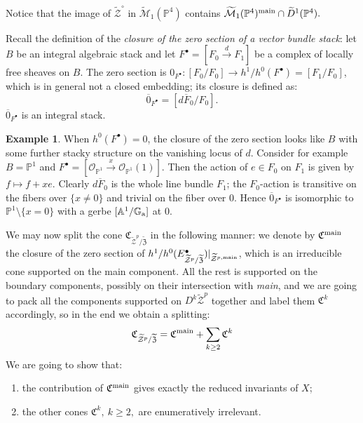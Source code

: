 \documentclass[11pt]{amsart}
\newcommand{\pazocal}{\mathcal}
\newcommand{\tM}{\widetilde{\mathcal{M}}}
\newcommand{\tZ}{\widetilde{\pazocal Z}}
\newcommand{\tZp}{\widetilde{\pazocal Z}^p}
\newcommand{\tXP}{\widetilde{\mathfrak Z}}
\newcommand{\PP}{\mathbb P}
\newcommand{\OO}{\mathcal{O}}
\renewcommand{\to}{\rightarrow}
\newcommand{\Aaff}{\mathbb{A}}
\theoremstyle{definition}
\theoremstyle{definition}
\newtheorem{ex}[thm]{Example}
\begin{document}
Notice that the image of $\tZ^{\circ}$ in $\tM_1(\PP^4)$ contains $\tM_1(\PP^4)^{\rm{main}}\cap \widetilde{D}^1(\PP^4).$

Recall the definition of the \emph{closure of the zero section of a vector bundle stack}: let $B$ be an integral algebraic stack and let $F^{\bullet}=[F_0\xrightarrow{d} F_1]$ be a complex of locally free sheaves on $B$. The zero section is $0_{F^{\bullet}}\colon [F_0/F_0]\to h^1/h^0(F^{\bullet})=[F_1/F_0]$, which is in general not a closed embedding; its closure is defined as:
\[ \overline{0}_{F^{\bullet}}=[\overline{dF_0}/F_0]. \]
$\overline{0}_{F^{\bullet}}$ is an integral stack.

\begin{ex}
When $h^0(F^{\bullet})=0$, the closure of the zero section looks like $B$ with some further stacky structure on the vanishing locus of $d$. Consider for example $B=\PP^1$ and $F^{\bullet}=[\OO_{\PP^1}\xrightarrow{x}\OO_{\PP^1}(1)]$. Then the action of $e\in F_0$ on $F_1$ is given by $f\mapsto f+xe$. Clearly $\overline{dF_0}$ is the whole line bundle $F_1$; the $F_0$-action is transitive on the fibers over $\{x\neq 0\}$ and trivial on the fiber over $0$. Hence $\overline{0}_{F^{\bullet}}$ is isomorphic to $\PP^1\setminus\{x=0\}$ with a gerbe $[\Aaff^1/\mathbb G_{\rm a}]$ at $0$.
\end{ex}

We may now split the cone $\mathfrak{C}_{\tZp/\tXP}$ in the following manner: we denote by $\mathfrak C^{\rm{main}}$ the closure of the zero section of $h^1/h^0(E^{\bullet}_{\tZp/\tXP})\rvert_{\tZ^{p,\rm{main}}}$, which is an irreducible cone supported on the main component. All the rest is supported on the boundary components, possibly on their intersection with \emph{main}, and we are going to pack all the components supported on $D^k\tZp$ together and label them $\mathfrak C^k$ accordingly, so in the end we obtain a splitting:
\[
 \mathfrak{C}_{\tZp/\tXP}=\mathfrak C^{\rm{main}}+\sum_{k\geq 2} \mathfrak C^k
\]
We are going to show that:
\begin{enumerate}
 \item the contribution of $\mathfrak C^{\rm{main}}$ gives exactly the reduced invariants of $X$;
 \item the other cones $\mathfrak C^k,\ k\geq 2,$ are enumeratively irrelevant.
\end{enumerate}
\end{document}
